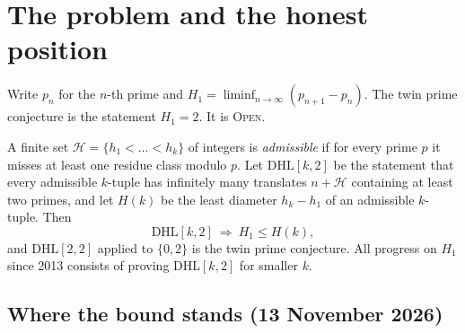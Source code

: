\documentclass[11pt]{amsart}
\theoremstyle{definition}
\theoremstyle{remark}
\newcommand{\lbl}[1]{\textup{\textsc{#1}}}
\newcommand{\DHL}{\mathrm{DHL}}
\begin{document}
\maketitle

\section{The problem and the honest position}

Write $p_n$ for the $n$-th prime and $H_1=\liminf_{n\to\infty}(p_{n+1}-p_n)$.
The twin prime conjecture is the statement $H_1=2$. It is \lbl{Open}.

A finite set $\mathcal H=\{h_1<\dots<h_k\}$ of integers is \emph{admissible} if
for every prime $p$ it misses at least one residue class modulo $p$. Let
$\DHL[k,2]$ be the statement that every admissible $k$-tuple has infinitely
many translates $n+\mathcal H$ containing at least two primes, and let $H(k)$
be the least diameter $h_k-h_1$ of an admissible $k$-tuple. Then
\begin{equation}\label{eq:reduction}
\DHL[k,2]\ \Longrightarrow\ H_1\le H(k),
\end{equation}
and $\DHL[2,2]$ applied to $\{0,2\}$ is the twin prime conjecture. All progress
on $H_1$ since 2013 consists of proving $\DHL[k,2]$ for smaller $k$.

\subsection*{Where the bound stands (13 November 2026)}
\end{document}

